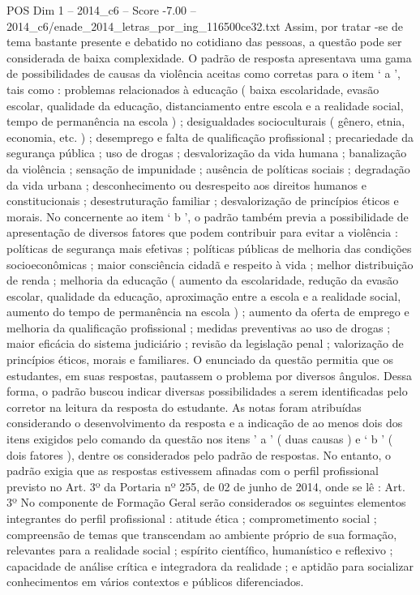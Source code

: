 \begin{textsample}{POS Dim 1 – 2014\_c6 – Score -7.00 – 2014\_c6/enade\_2014\_letras\_por\_ing\_116500ce32.txt}
Assim, por tratar -se de tema bastante presente e debatido no cotidiano das pessoas, a questão pode ser considerada de baixa complexidade.
O padrão de resposta apresentava uma gama de possibilidades de causas da violência aceitas como corretas para o item ‘ a ’, tais como : problemas relacionados à educação ( baixa escolaridade, evasão escolar, qualidade da educação, distanciamento entre escola e a realidade social, tempo de permanência na escola ) ; desigualdades socioculturais ( gênero, etnia, economia, etc. ) ; desemprego e falta de qualificação profissional ; precariedade da segurança pública ; uso de drogas ; desvalorização da vida humana ; banalização da violência ; sensação de impunidade ; ausência de políticas sociais ; degradação da vida urbana ; desconhecimento ou desrespeito aos direitos humanos e constitucionais ; desestruturação familiar ; desvalorização de princípios éticos e morais.
No concernente ao item ‘ b ’, o padrão também previa a possibilidade de apresentação de diversos fatores que podem contribuir para evitar a violência : políticas de segurança mais efetivas ; políticas públicas de melhoria das condições socioeconômicas ; maior consciência cidadã e respeito à vida ; melhor distribuição de renda ; melhoria da educação ( aumento da escolaridade, redução da evasão escolar, qualidade da educação, aproximação entre a escola e a realidade social, aumento do tempo de permanência na escola ) ; aumento da oferta de emprego e melhoria da qualificação profissional ; medidas preventivas ao uso de drogas ; maior eficácia do sistema judiciário ; revisão da legislação penal ; valorização de princípios éticos, morais e familiares.
O enunciado da questão permitia que os estudantes, em suas respostas, pautassem o problema por diversos ângulos.
Dessa forma, o padrão buscou indicar diversas possibilidades a serem identificadas pelo corretor na leitura da resposta do estudante.
As notas foram atribuídas considerando o desenvolvimento da resposta e a indicação de ao menos dois dos itens exigidos pelo comando da questão nos itens ’ a ’ ( duas causas ) e ‘ b ’ ( dois fatores ), dentre os considerados pelo padrão de respostas.
No entanto, o padrão exigia que as respostas estivessem afinadas com o perfil profissional previsto no Art. 3º da Portaria nº 255, de 02 de junho de 2014, onde se lê : Art. 3º No componente de Formação Geral serão considerados os seguintes elementos integrantes do perfil profissional : atitude ética ; comprometimento social ; compreensão de temas que transcendam ao ambiente próprio de sua formação, relevantes para a realidade social ; espírito científico, humanístico e reflexivo ; capacidade de análise crítica e integradora da realidade ; e aptidão para socializar conhecimentos em vários contextos e públicos diferenciados.

\end{textsample}
